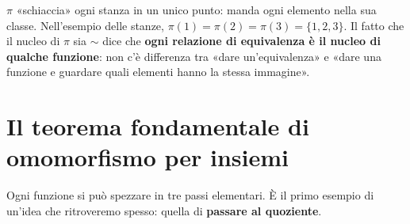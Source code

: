 \begin{spiegazione}
    $\pi$ «schiaccia» ogni stanza in un unico punto: manda ogni elemento nella sua classe. Nell'esempio delle stanze,
    $\pi(1) = \pi(2) = \pi(3) = \{1, 2, 3\}$. Il fatto che il nucleo di $\pi$ sia $\sim$ dice che \textbf{ogni relazione di
    equivalenza è il nucleo di qualche funzione}: non c'è differenza tra «dare un'equivalenza» e «dare una funzione e guardare
    quali elementi hanno la stessa immagine».
\end{spiegazione}

\section{Il teorema fondamentale di omomorfismo per insiemi}\label{sec:omomorfismo-insiemi}

Ogni funzione si può spezzare in tre passi elementari. È il primo esempio di un'idea che ritroveremo spesso: quella di
\textbf{passare al quoziente}.

